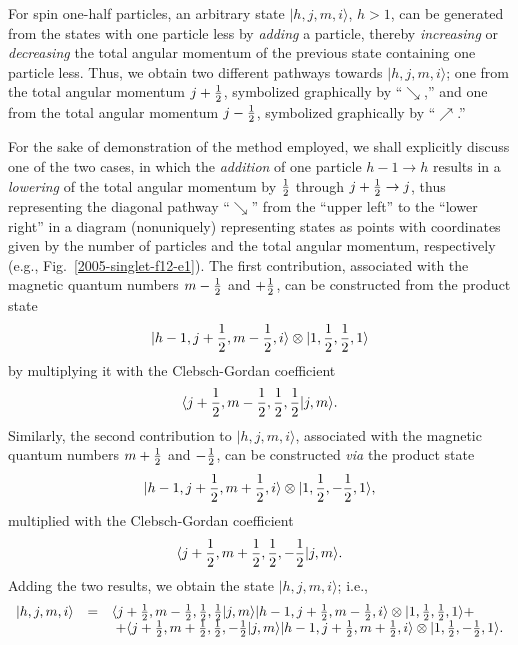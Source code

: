 \documentclass[rmp,amsfonts,showpacs,showkeys,preprint]{revtex4}
\begin{document}
For spin one-half particles, an arbitrary state $|h,j,m,i\rangle$, $h>1$, can be generated
from the states with one particle less by {\em adding} a particle,
thereby {\em increasing} or {\em decreasing} the total angular momentum of the previous state containing one particle less.
Thus, we obtain two different pathways towards $|h,j,m,i\rangle$;
one from the total angular momentum $j+{1\over 2}$, symbolized graphically by ``{\color{blue}$\searrow$},''
and one from the total angular momentum $j-{1\over 2}$, symbolized graphically by ``{\color{blue}$\nearrow$}.''

For the sake of demonstration of the method employed,
we shall explicitly discuss one of the two cases, in which the {\em addition} of one particle $h-1 \rightarrow h$
results in a {\em lowering} of the total angular momentum
by ${1\over 2}$ through $j+{1\over 2} \rightarrow j$,
thus representing the diagonal pathway ``{\color{blue}$\searrow$}'' from the ``upper left'' to the ``lower right'' in a
diagram (nonuniquely) representing states as points with coordinates given by the number of particles and the total angular momentum, respectively
(e.g., Fig.~\ref{2005-singlet-f12-e1}).
The first contribution,
associated with the magnetic quantum numbers $m-{1\over2}$ and $+{1\over2}$, can be constructed  from the
product state
\begin{equation}
|h-1,j+{1\over2},m-{1\over2},i\rangle  \otimes  |1,{1\over2},{1\over2},1\rangle
\end{equation}
by
multiplying it with the Clebsch-Gordan coefficient
\begin{equation}
\langle j+{1\over2},m-{1\over2},{1\over2},{1\over2}|j,m\rangle .
\end{equation}
Similarly, the second contribution  to $|h,j,m,i\rangle$,
associated with the magnetic quantum numbers $m+{1\over2}$ and $-{1\over2}$,
can be constructed {\it via}
the product state
\begin{equation}
|h-1,j+{1\over2},m+{1\over2},i\rangle\otimes|1,{1\over2},-{1\over2},1\rangle ,
\end{equation}
multiplied with the Clebsch-Gordan coefficient
\begin{equation}
\langle j+{1\over2},m+{1\over2},{1\over2},-{1\over2}|j,m\rangle .
\end{equation}
Adding
the two results, we obtain the state $|h,j,m,i\rangle$; i.e.,
\begin{equation}
\begin{array}{rcl}
|h,j,m,i\rangle &=&   \langle j+{1\over2},m-{1\over2},{1\over2},{1\over2}|j,m\rangle |h-1,j+{1\over2},m-{1\over2},i\rangle  \otimes  |1,{1\over2},{1\over2},1\rangle  +\\
&&\; + \langle j+{1\over2},m+{1\over2},{1\over2},-{1\over2}|j,m\rangle  |h-1,j+{1\over2},m+{1\over2},i\rangle\otimes|1,{1\over2},-{1\over2},1\rangle
.
\end{array}
\end{equation}
\end{document}
